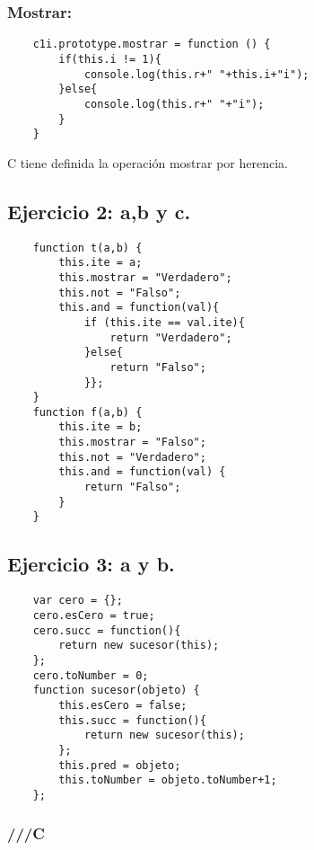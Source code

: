 \documentclass[10pt,a4paper]{article}
\begin{document}
\subsubsection{Mostrar:}
    \begin{lstlisting}
    c1i.prototype.mostrar = function () {
    	if(this.i != 1){
    		console.log(this.r+" "+this.i+"i");
    	}else{
    		console.log(this.r+" "+"i");
    	}
    }
    \end{lstlisting}
    C tiene definida la operación mostrar por herencia.
\subsection{Ejercicio 2: a,b y c.}
    \begin{lstlisting}
    function t(a,b) {
    	this.ite = a;
    	this.mostrar = "Verdadero";
    	this.not = "Falso";
    	this.and = function(val){ 
    		if (this.ite == val.ite){
    			return "Verdadero";	
    		}else{
    			return "Falso";
    		}};
    }
    function f(a,b) {
    	this.ite = b;
    	this.mostrar = "Falso";
    	this.not = "Verdadero";
    	this.and = function(val) {
    		return "Falso";
    	}
    }
    \end{lstlisting}
\subsection{Ejercicio 3: a y b.}
    \begin{lstlisting}
    var cero = {};
    cero.esCero = true;
    cero.succ = function(){ 
    	return new sucesor(this);
    };
    cero.toNumber = 0;
    function sucesor(objeto) {
    	this.esCero = false;
    	this.succ = function(){ 
    		return new sucesor(this);
    	};
    	this.pred = objeto;
    	this.toNumber = objeto.toNumber+1;
    };
    \end{lstlisting}
\subsubsection{///C}
    \begin{lstlisting}
    \end{lstlisting}
\end{document}

